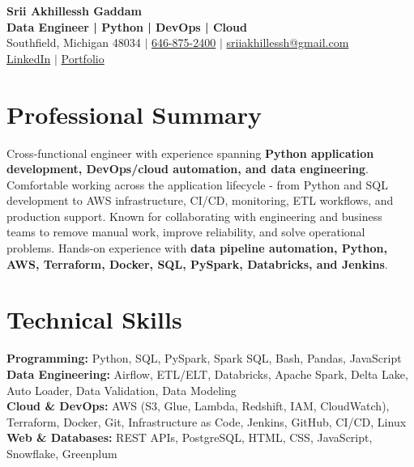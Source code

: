 \documentclass[letterpaper,10pt]{article}
\begin{document}
\fontsize{9.35pt}{10.45pt}\selectfont

\begin{center}
    {\LARGE \textbf{Srii Akhillessh Gaddam}} \\[-1pt]
    \textbf{Data Engineer | Python | DevOps | Cloud} \\[2pt]
    Southfield, Michigan 48034 $|$
    \href{tel:6468752400}{646-875-2400} $|$
    \href{mailto:sriiakhillessh@gmail.com}{sriiakhillessh@gmail.com} \\[1pt]
    \href{https://www.linkedin.com/in/srii-akhiilessh-gaddam-b48668191/}{LinkedIn} $|$
    \href{https://sriiakhillesshg.github.io/portfolio/}{Portfolio}
\end{center}
\vspace{-8pt}

\section{Professional Summary}
\small{Cross-functional engineer with experience spanning \textbf{Python application development, DevOps/cloud automation, and data engineering}. Comfortable working across the application lifecycle - from Python and SQL development to AWS infrastructure, CI/CD, monitoring, ETL workflows, and production support. Known for collaborating with engineering and business teams to remove manual work, improve reliability, and solve operational problems. Hands-on experience with \textbf{data pipeline automation, Python, AWS, Terraform, Docker, SQL, PySpark, Databricks, and Jenkins}.}

\section{Technical Skills}
\small{
\textbf{Programming:} Python, SQL, PySpark, Spark SQL, Bash, Pandas, JavaScript \\
\textbf{Data Engineering:} Airflow, ETL/ELT, Databricks, Apache Spark, Delta Lake, Auto Loader, Data Validation, Data Modeling \\
\textbf{Cloud \& DevOps:} AWS (S3, Glue, Lambda, Redshift, IAM, CloudWatch), Terraform, Docker, Git, Infrastructure as Code, Jenkins, GitHub, CI/CD, Linux \\
\textbf{Web \& Databases:} REST APIs, PostgreSQL, HTML, CSS, JavaScript, Snowflake, Greenplum
}
\end{document}
